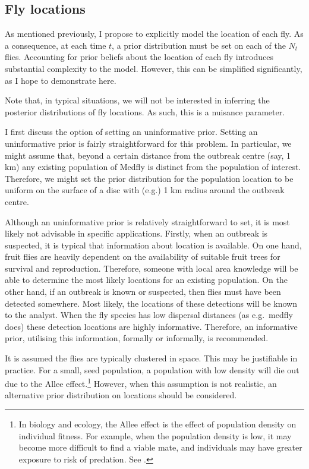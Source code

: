 \documentclass[
  oneside]{book}
\begin{document}
\hypertarget{fly-locations}{%
\subsection{Fly locations}\label{fly-locations}}

As mentioned previously, I propose to explicitly model the location of each fly. As a consequence, at each time \(t\), a prior distribution must be set on each of the \(N_t\) flies. Accounting for prior beliefs about the location of each fly introduces substantial complexity to the model. However, this can be simplified significantly, as I hope to demonstrate here.

Note that, in typical situations, we will not be interested in inferring the posterior distributions of fly locations. As such, this is a nuisance parameter.

I first discuss the option of setting an uninformative prior. Setting an uninformative prior is fairly straightforward for this problem. In particular, we might assume that, beyond a certain distance from the outbreak centre (say, 1 km) any existing population of Medfly is distinct from the population of interest. Therefore, we might set the prior distribution for the population location to be uniform on the surface of a disc with (e.g.) 1 km radius around the outbreak centre.

Although an uninformative prior is relatively straightforward to set, it is most likely not advisable in specific applications. Firstly, when an outbreak is suspected, it is typical that information about location is available. On one hand, fruit flies are heavily dependent on the availability of suitable fruit trees for survival and reproduction. Therefore, someone with local area knowledge will be able to determine the most likely locations for an existing population. On the other hand, if an outbreak is known or suspected, then flies must have been detected somewhere. Most likely, the locations of these detections will be known to the analyst. When the fly species has low dispersal distances (as e.g.~medfly does) these detection locations are highly informative. Therefore, an informative prior, utilising this information, formally or informally, is recommended.

It is assumed the flies are typically clustered in space. This may be justifiable in practice. For a small, seed population, a population with low density will die out due to the Allee effect.\footnote{In biology and ecology, the Allee effect is the effect of population density on individual fitness. For example, when the population density is low, it may become more difficult to find a viable mate, and individuals may have greater exposure to risk of predation. See \citet{stephens1999}.} However, when this assumption is not realistic, an alternative prior distribution on locations should be considered.
\end{document}
